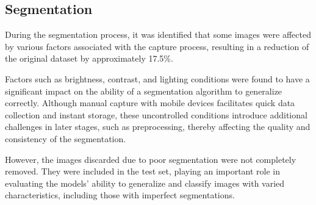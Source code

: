 \subsection{Segmentation}

During the segmentation process, it was identified that some images were affected by various factors associated with the capture process, resulting in a reduction of the original dataset by approximately 17.5\%.

Factors such as brightness, contrast, and lighting conditions were found to have a significant impact on the ability of a segmentation algorithm to generalize correctly. Although manual capture with mobile devices facilitates quick data collection and instant storage, these uncontrolled conditions introduce additional challenges in later stages, such as preprocessing, thereby affecting the quality and consistency of the segmentation.

However, the images discarded due to poor segmentation were not completely removed. They were included in the test set, playing an important role in evaluating the models' ability to generalize and classify images with varied characteristics, including those with imperfect segmentations.
